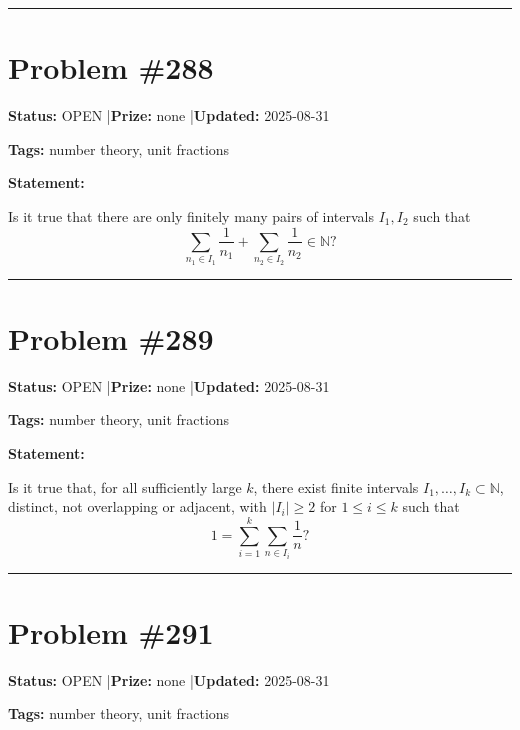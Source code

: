 \documentclass{article}
\begin{document}
\noindent\rule{\linewidth}{0.4pt}


\section{Problem \#288}
\label{prob:288}

\noindent\textbf{Status:} OPEN \quad|\quad \textbf{Prize:} none \quad|\quad \textbf{Updated:} 2025-08-31

\noindent\textbf{Tags:} number theory, unit fractions

\medskip

\noindent\textbf{Statement:}

Is it true that there are only finitely many pairs of intervals $I_1,I_2$ such that\[\sum_{n_1\in I_1}\frac{1}{n_1}+\sum_{n_2\in I_2}\frac{1}{n_2}\in \mathbb{N}?\]

\noindent\rule{\linewidth}{0.4pt}


\section{Problem \#289}
\label{prob:289}

\noindent\textbf{Status:} OPEN \quad|\quad \textbf{Prize:} none \quad|\quad \textbf{Updated:} 2025-08-31

\noindent\textbf{Tags:} number theory, unit fractions

\medskip

\noindent\textbf{Statement:}

Is it true that, for all sufficiently large $k$, there exist finite intervals $I_1,\ldots,I_k\subset \mathbb{N}$, distinct, not overlapping or adjacent, with $\lvert I_i\rvert \geq 2$ for $1\leq i\leq k$ such that\[1=\sum_{i=1}^k \sum_{n\in I_i}\frac{1}{n}?\]

\noindent\rule{\linewidth}{0.4pt}


\section{Problem \#291}
\label{prob:291}

\noindent\textbf{Status:} OPEN \quad|\quad \textbf{Prize:} none \quad|\quad \textbf{Updated:} 2025-08-31

\noindent\textbf{Tags:} number theory, unit fractions
\end{document}
